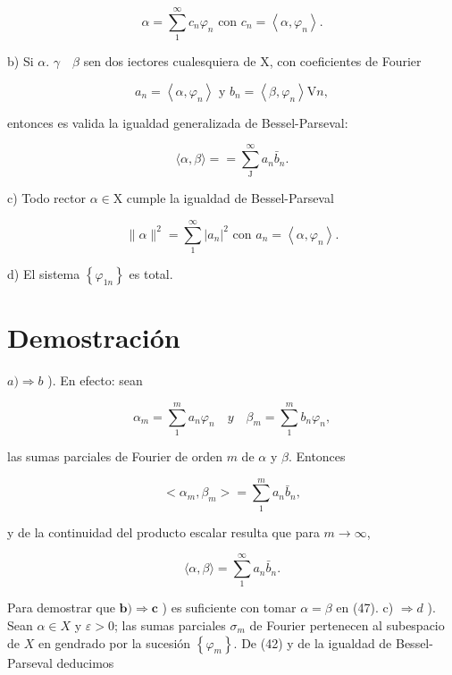 \documentclass[10pt]{article}
\theoremstyle{plain}
\theoremstyle{definition}
\theoremstyle{remark}
\begin{document}
\begin{equation*}
\alpha=\sum_{1}^{\infty} c_{n} \varphi_{n} \text { con } c_{n}=\left\langle\alpha, \varphi_{n}\right\rangle . \tag{4-6}
\end{equation*}


b) Si $\alpha$. $\gamma \quad \beta$ sen dos iectores cualesquiera de X, con coeficientes de Fourier


\begin{equation*}
a_{n}=\left\langle\alpha, \varphi_{n}\right\rangle \text { y } b_{n}=\left\langle\beta, \varphi_{n}\right\rangle \mathrm{V} n, \tag{4-7}
\end{equation*}


entonces es valida la igualdad generalizada de Bessel-Parseval:

$$
\langle\alpha, \beta\rangle==\sum_{\mathrm{J}}^{\infty} a_{n} \bar{b}_{n} .
$$

c) Todo rector $\alpha \in \mathrm{X}$ cumple la igualdad de Bessel-Parseval


\begin{equation*}
\|\alpha\|^{2}=\sum_{1}^{\infty}\left|a_{n}\right|^{2} \text { con } a_{n}=\left\langle\alpha, \varphi_{n}\right\rangle . \tag{4-8}
\end{equation*}


d) El sistema $\left\{\varphi_{1 n}\right\}$ es total.

\section*{Demostración}
$a) \Rightarrow b$ ). En efecto: sean

$$
\alpha_{m}=\sum_{1}^{m} a_{n} \varphi_{n} \quad y \quad \beta_{m}=\sum_{1}^{m} b_{n} \varphi_{n},
$$

las sumas parciales de Fourier de orden $m$ de $\alpha$ y $\beta$. Entonces


\begin{equation*}
<\alpha_{m}, \beta_{m}>=\sum_{1}^{m} a_{n} \bar{b}_{n}, \tag{4-9}
\end{equation*}


y de la continuidad del producto escalar resulta que para $m \rightarrow \infty$,

$$
\langle\alpha, \beta\rangle=\sum_{1}^{\infty} a_{n} \bar{b}_{n} .
$$

Para demostrar que $\boldsymbol{b}) \Rightarrow \boldsymbol{c}$ ) es suficiente con tomar $\alpha=\beta$ en (47). c) $\Rightarrow d$ ). Sean $\alpha \in X$ y $\varepsilon>0$; las sumas parciales $\sigma_{m}$ de Fourier pertenecen al subespacio de $X$ en gendrado por la sucesión $\left\{\varphi_{m}\right\}$. De (42) y de la igualdad de Bessel-Parseval deducimos
\end{document}
